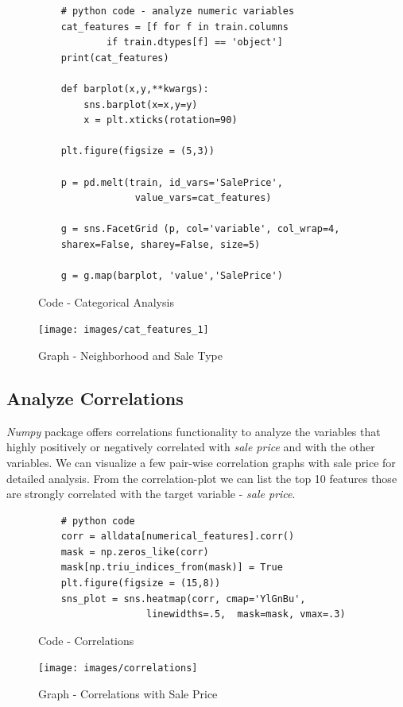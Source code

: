 \documentclass[sigconf]{acmart}
\begin{document}
	\begin{figure}[htb]
	\begin{verbatim}	
	# python code - analyze numeric variables
	cat_features = [f for f in train.columns 
			if train.dtypes[f] == 'object']
	print(cat_features)
	
	def barplot(x,y,**kwargs):
	    sns.barplot(x=x,y=y)
	    x = plt.xticks(rotation=90)
	
	plt.figure(figsize = (5,3))
	
	p = pd.melt(train, id_vars='SalePrice',
	             value_vars=cat_features)
	             
	g = sns.FacetGrid (p, col='variable', col_wrap=4, 
	sharex=False, sharey=False, size=5)
	
	g = g.map(barplot, 'value','SalePrice')				
	\end{verbatim}
	\caption{Code - Categorical Analysis} \label{c:analyze-cat} 
	\end{figure}

\begin{figure}[htb]
	\centering
	\texttt{[image: images/cat\_features\_1]}	
	\caption{Graph - Neighborhood and Sale Type} \label{fig:cat_features_1} 
\end{figure}
	
	\subsection{Analyze Correlations}		
	{\em Numpy} package offers correlations functionality to analyze the variables that highly positively or negatively correlated with {\em sale price} and with the other variables. We can  visualize a few pair-wise correlation graphs with sale price for detailed analysis. From the correlation-plot we can list the top 10 features those are strongly correlated with the target variable - {\em sale price}.
	
	\begin{figure}[htb]
	\begin{verbatim}	
	# python code 
	corr = alldata[numerical_features].corr()	
	mask = np.zeros_like(corr)
	mask[np.triu_indices_from(mask)] = True	
	plt.figure(figsize = (15,8))	
	sns_plot = sns.heatmap(corr, cmap='YlGnBu', 
	               linewidths=.5,  mask=mask, vmax=.3)	
	\end{verbatim}
	\caption{Code - Correlations} \label{c:cor} 
	\end{figure}

	\begin{figure}[htb]
		\centering
		\texttt{[image: images/correlations]}	
		\caption{Graph - Correlations with Sale Price} \label{fig:correlations} 
	\end{figure}
		
\end{document}
